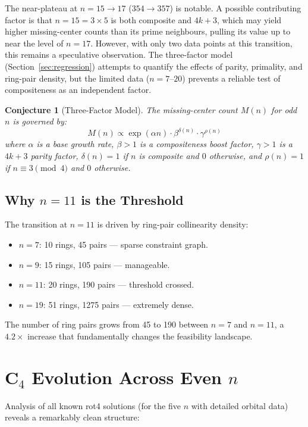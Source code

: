 \documentclass[11pt,a4paper]{article}
\theoremstyle{plain}
\newtheorem{conjecture}[theorem]{Conjecture}
\theoremstyle{definition}
\begin{document}
The near-plateau at $n=15\to17$ ($354\to357$) is notable. A possible contributing factor is that $n=15=3\times5$ is both composite and $4k+3$, which may yield higher missing-center counts than its prime neighbours, pulling its value up to near the level of $n=17$. However, with only two data points at this transition, this remains a speculative observation. The three-factor model (Section~\ref{sec:regression}) attempts to quantify the effects of parity, primality, and ring-pair density, but the limited data ($n=7$--$20$) prevents a reliable test of compositeness as an independent factor.

\begin{conjecture}[Three-Factor Model]
\label{conj:three}
The missing-center count $M(n)$ for odd $n$ is governed by:
\[
M(n) \propto \exp(\alpha n) \cdot \beta^{\delta(n)} \cdot \gamma^{\rho(n)}
\]
where $\alpha$ is a base growth rate, $\beta>1$ is a compositeness boost factor, $\gamma>1$ is a $4k+3$ parity factor, $\delta(n)=1$ if $n$ is composite and $0$ otherwise, and $\rho(n)=1$ if $n\equiv3\pmod{4}$ and $0$ otherwise.
\end{conjecture}

\subsection{Why $n=11$ is the Threshold}

The transition at $n=11$ is driven by ring-pair collinearity density:
\begin{itemize}
\item $n=7$: 10 rings, 45 pairs --- sparse constraint graph.
\item $n=9$: 15 rings, 105 pairs --- manageable.
\item $n=11$: 20 rings, 190 pairs --- threshold crossed.
\item $n=19$: 51 rings, 1275 pairs --- extremely dense.
\end{itemize}

The number of ring pairs grows from 45 to 190 between $n=7$ and $n=11$, a $4.2\times$ increase that fundamentally changes the feasibility landscape.

\section{C$_4$ Evolution Across Even $n$}
\label{sec:c4evol}

Analysis of all known rot4 solutions (for the five $n$ with detailed orbital data) reveals a remarkably clean structure:
\end{document}
